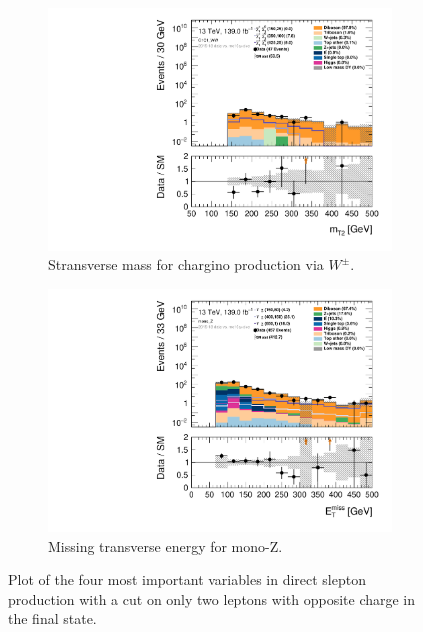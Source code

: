 \begin{figure}[H]
\begin{subfigure}[t!]{0.49\textwidth}
    \label{fig:my_label}
    \end{subfigure}
    \\
    \begin{subfigure}[t!]{0.49\textwidth}
        \includegraphics[width=\textwidth]{Figures/cutandcount/hist1d_mt2_C1C1_WW.pdf}
    \caption{Stransverse mass for chargino production via $W^\pm$.}
    \label{fig:my_label}
    \end{subfigure}
    \begin{subfigure}[t!]{0.49\textwidth}
        \includegraphics[width=\textwidth]{Figures/cutandcount/hist1d_met_Et_mono_Z.pdf}
    \caption{Missing transverse energy for mono-Z.}
    \label{fig:my_label}
    \end{subfigure}
    \caption{Plot of the four most important variables in direct slepton production with a cut on only two leptons with opposite charge in the final state.}
    \label{fig:cutandcountMONA}
\end{figure}
\restoregeometry

